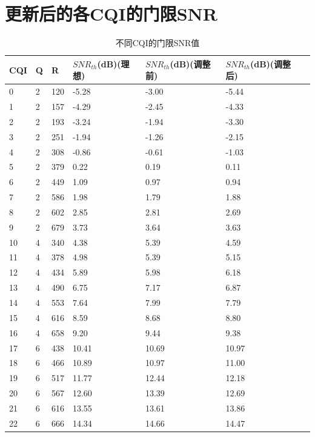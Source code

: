 \documentclass{article}
\begin{document}
\section{更新后的各CQI的门限SNR}
\begin{table}[H]
	\caption{不同CQI的门限SNR值}
	\centering
	\begin{tabular}{|l|l|l|l|l|l|l|}%
		\hline  %
		CQI		& Q		& R		& $SNR_{th}$(dB)(理想)	& $SNR_{th}$(dB)(调整前)	& $SNR_{th}$(dB)(调整后)	\\
		\hline
		0		& 2		& 120	& -5.28	& -3.00	& -5.44 \\
		\hline
		1		& 2		& 157	& -4.29	& -2.45	& -4.33 \\
		\hline
		2		& 2		& 193	& -3.24	& -1.94	& -3.30 \\
		\hline
		3		& 2		& 251	& -1.94	& -1.26	& -2.15 \\
		\hline
		4		& 2		& 308	& -0.86	& -0.61	& -1.03 \\
		\hline
		5		& 2		& 379	&  0.22	& 0.19	& 0.11 \\
		\hline
		6		& 2		& 449	&  1.09	& 0.97	& 0.94 \\
		\hline
		7		& 2		& 586	&  1.98	& 1.79	& 1.88  \\
		\hline
		8		& 2		& 602	&  2.85	& 2.81	& 2.69  \\
		\hline
		9		& 2		& 679	&  3.73	& 3.64	& 3.63  \\
		\hline
		10		& 4		& 340	&  4.38	& 5.39	& 4.59  \\
		\hline
		11		& 4		& 378	&  4.98	& 5.39	& 5.15  \\
		\hline
		12		& 4		& 434	&  5.89	& 5.98	& 6.18  \\
		\hline
		13		& 4		& 490	&  6.75	& 7.17	& 6.87  \\
		\hline
		14		& 4		& 553	&  7.64	& 7.99	& 7.79  \\
		\hline
		15		& 4		& 616	&  8.59	& 8.68	& 8.80 \\
		\hline
		16		& 4		& 658	&  9.20	& 9.44	& 9.38 \\
		\hline
		17		& 6		& 438	& 10.41	& 10.69	& 10.97 \\
		\hline
		18		& 6		& 466	& 10.89	& 10.97	& 11.00 \\
		\hline
		19		& 6		& 517	& 11.77	& 12.44	& 12.18 \\
		\hline
		20		& 6		& 567	& 12.60	& 13.39	& 12.69 \\
		\hline
		21		& 6		& 616	& 13.55	& 13.61	& 13.86 \\
		\hline
		22		& 6		& 666	& 14.34	& 14.66	& 14.47 \\

\end{tabular}
\end{table}
\end{document}
